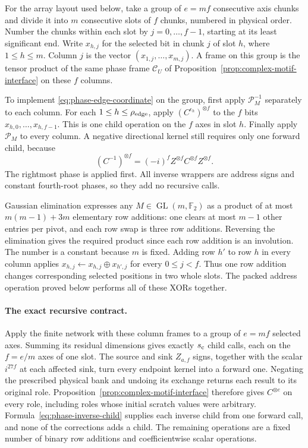 For the array layout used below, take a group of $e=mf$ consecutive
axis chunks and divide it into $m$ consecutive slots of $f$ chunks,
numbered in physical order.
Number the chunks within each slot by $j=0,\ldots,f-1$, starting at
its least significant end.  Write $x_{h,j}$ for the selected bit in
chunk $j$ of slot $h$, where $1\le h\le m$.  Column $j$ is the vector
$(x_{1,j},\ldots,x_{m,j})$.  A frame on this group is the tensor
product of the same phase frame
$\mathcal C_U$ of Proposition~\ref{prop:complex-motif-interface}
on these $f$ columns.

To implement \eqref{eq:phase-edge-coordinate} on the group, first apply
$\mathcal P_M^{-1}$ separately to each column.  For each
$1\le h\le\rho_{\rm edge}$, apply $(C^{\epsilon_h})^{\otimes f}$ to the
$f$ bits $x_{h,0},\ldots,x_{h,f-1}$.  This is one child operation
on the $f$ axes in slot $h$.  Finally apply $\mathcal P_M$ to every
column.  A negative directional kernel still requires only one
forward child, because
\begin{equation}\label{eq:phase-inverse-child}
 (C^{-1})^{\otimes f}
 =(-i)^f Z^{\otimes f}C^{\otimes f}Z^{\otimes f}.
\end{equation}
The rightmost phase is applied first.  All inverse wrappers are address
signs and constant fourth-root phases, so they add no recursive calls.

Gaussian elimination expresses any $M\in\operatorname{GL}(m,\mathbb F_2)$
as a product of at most $m(m-1)+3m$ elementary row additions: one clears
at most $m-1$ other entries per pivot, and each row swap is three row
additions.  Reversing the elimination gives the required product since
each row addition is an involution.  The number is a constant because
$m$ is fixed.  Adding row $h'$ to row $h$ in every column applies
$x_{h,j}\leftarrow x_{h,j}\mathbin\oplus x_{h',j}$ for every
$0\le j<f$.  Thus one row addition changes corresponding selected
positions in two whole slots.  The packed address operation proved
below performs all of these XORs together.

\paragraph{The exact recursive contract.}
Apply the finite network with these column frames to a group of
$e=mf$ selected axes.  Summing its residual dimensions gives exactly
$s_{\rm c}$ child calls, each on the $f=e/m$ axes of one slot.
The source and sink $Z_{a,f}$ signs, together with the scalar
$i^{27f}$ at each affected sink, turn every endpoint kernel into a
forward one.  Negating the prescribed physical bank
and undoing its exchange returns each result to its original role.
Proposition~\ref{prop:complex-motif-interface} therefore gives
$C^{\otimes e}$ on every role, including roles whose initial scratch
values were arbitrary.  Formula~\eqref{eq:phase-inverse-child} supplies
each inverse child from one forward call, and none of the corrections
adds a child.  The remaining operations are a fixed number of binary
row additions and coefficientwise scalar operations.

